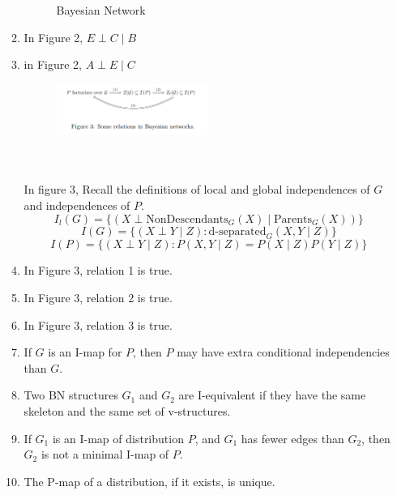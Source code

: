 \documentclass[a3paper,12pt]{extarticle} %
\begin{document}
\begin{enumerate}
\begin{enumerate}
\begin{figure}[h]
        \caption{Bayesian Network}
    \end{figure}
    \item In Figure 2, \(E \perp C \mid B\)
    \item in Figure 2, \(A \perp E \mid C\)
    \begin{figure}[h]
        \centering
        \includegraphics[width=0.5\textwidth]{bn3.png}
    \end{figure}
    \\\\ In figure 3, 
Recall the definitions of local and global independences of \( G \) and independences of \( P \).
\[
I_l(G) = \{(X \perp \text{NonDescendants}_G(X) \mid \text{Parents}_G(X))\} \tag{1}
\]
\[
I(G) = \{(X \perp Y \mid Z) : \text{d-separated}_G(X, Y \mid Z)\} \tag{2}
\]
\[
I(P) = \{(X \perp Y \mid Z) : P(X, Y \mid Z) = P(X \mid Z)P(Y \mid Z)\} \tag{3}
\]
\item In Figure 3, relation 1 is true.
\item In Figure 3, relation 2 is true.
\item In Figure 3, relation 3 is true.
\item If \( G \) is an I-map for \( P \), then \( P \) may have extra conditional independencies than \( G \).
\item Two BN structures \( G_1 \) and \( G_2 \) are I-equivalent if they have the same skeleton and the same set of v-structures.
\item If \( G_1 \) is an I-map of distribution \( P \), and \( G_1 \) has fewer edges than \( G_2 \), then \( G_2 \) is not a minimal I-map of \( P \).
\item The P-map of a distribution, if it exists, is unique.
\end{enumerate}
\end{enumerate}
\end{document}
